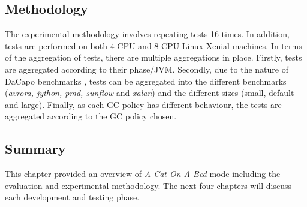 \subsection{Methodology}
The experimental methodology involves repeating tests 16 times. In
addition, tests are performed on both 4-CPU and 8-CPU Linux Xenial
machines. In terms of the aggregation of tests, there are multiple
aggregations in place. Firstly, tests are aggregated according to their
phase/JVM. Secondly, due to the nature of DaCapo benchmarks
\cite{blackburn2006dacapo}, tests can be aggregated into the
different benchmarks (\emph{avrora, jython, pmd, sunflow} and \emph{xalan}) and the
different sizes (small, default and large). Finally, as each GC policy
has different behaviour, the tests are aggregated according to the GC
policy chosen.

\subsection{Summary}
This chapter provided an overview of \emph{A Cat On A Bed} mode including the evaluation and experimental methodology. The next four chapters will discuss each development and testing phase. 